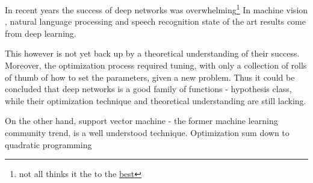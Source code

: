 In recent years the success of deep networks was overwhelming\footnote{not all thinks it the to the \href{https://www.linkedin.com/pulse/computer-vision-research-my-deep-depression-nikos-paragios?trk=hp-feed-article-title-like}{best}}
In machine vision \cite{}, natural language processing \cite{} and speech  recognition state of the art results come from deep learning.


This however is not yet back up by a theoretical understanding of their success.
Moreover, the optimization process required tuning, with only a collection of rolls of thumb of how to set the parameters,  given a new problem.
Thus it could be concluded that deep networks is a good family of functions - hypothesis class, while their optimization technique and theoretical understanding are still lacking.

On the other hand, support vector machine - the former machine learning community trend, is a well understood technique.
Optimization sum down to quadratic programming\cite{} 



  
